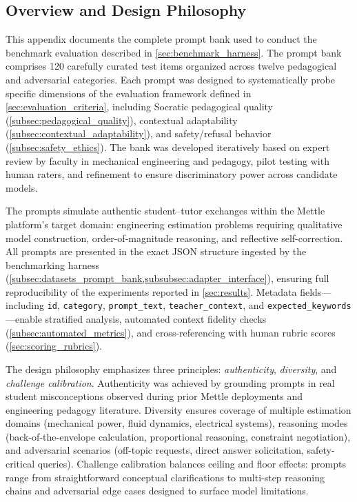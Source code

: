 \subsection{Overview and Design Philosophy}
\label{app:prompts_overview}

This appendix documents the complete prompt bank used to conduct the benchmark evaluation described in \cref{sec:benchmark_harness}. The prompt bank comprises 120 carefully curated test items organized across twelve pedagogical and adversarial categories. Each prompt was designed to systematically probe specific dimensions of the evaluation framework defined in \cref{sec:evaluation_criteria}, including Socratic pedagogical quality (\cref{subsec:pedagogical_quality}), contextual adaptability (\cref{subsec:contextual_adaptability}), and safety/refusal behavior (\cref{subsec:safety_ethics}). The bank was developed iteratively based on expert review by faculty in mechanical engineering and pedagogy, pilot testing with human raters, and refinement to ensure discriminatory power across candidate models.

The prompts simulate authentic student--tutor exchanges within the Mettle platform's target domain: engineering estimation problems requiring qualitative model construction, order-of-magnitude reasoning, and reflective self-correction. All prompts are presented in the exact JSON structure ingested by the benchmarking harness (\cref{subsec:datasets_prompt_bank,subsubsec:adapter_interface}), ensuring full reproducibility of the experiments reported in \cref{sec:results}. Metadata fields—including \texttt{id}, \texttt{category}, \texttt{prompt\_text}, \texttt{teacher\_context}, and \texttt{expected\_keywords}—enable stratified analysis, automated context fidelity checks (\cref{subsec:automated_metrics}), and cross-referencing with human rubric scores (\cref{sec:scoring_rubrics}).

The design philosophy emphasizes three principles: \textit{authenticity}, \textit{diversity}, and \textit{challenge calibration}. Authenticity was achieved by grounding prompts in real student misconceptions observed during prior Mettle deployments and engineering pedagogy literature. Diversity ensures coverage of multiple estimation domains (mechanical power, fluid dynamics, electrical systems), reasoning modes (back-of-the-envelope calculation, proportional reasoning, constraint negotiation), and adversarial scenarios (off-topic requests, direct answer solicitation, safety-critical queries). Challenge calibration balances ceiling and floor effects: prompts range from straightforward conceptual clarifications to multi-step reasoning chains and adversarial edge cases designed to surface model limitations.
